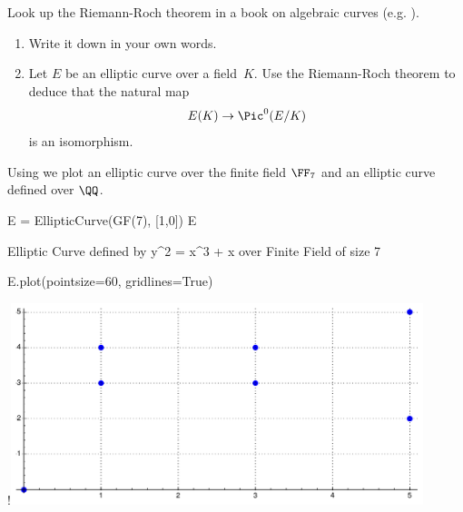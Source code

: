 \begin{exercise}
  Look up the Riemann-Roch theorem in a book on algebraic curves
  (e.g. \cite{hartshorne,liu2006algebraic}).
  \begin{enumerate}[label=(\alph*)]
    \item Write it down in your own words.
    \item Let $E$ be an elliptic curve over a field~$K$.
    Use the Riemann-Roch theorem to deduce that the natural map
    \[
      E(K) \to \Pic^0(E/K)
    \]
    is an isomorphism.
  \end{enumerate}
\end{exercise}

Using {\Sage} we plot an elliptic curve over the finite field $\FF_7$ and an
elliptic curve defined over $\QQ$.
\begin{sagecode} %
\begin{sagecell}
E = EllipticCurve(GF(7), [1,0])
E
\end{sagecell}
\begin{sageout}
Elliptic Curve defined by y^2 = x^3 + x over
Finite Field of size 7
\end{sageout}
\end{sagecode}
\begin{sagecode}
\begin{sagecell} %
E.plot(pointsize=60, gridlines=True)
\end{sagecell}
\begin{sageout}[escapechar=!]
!\includegraphics[width=0.9\textwidth]{img/ecmod7}
\end{sageout}
\end{sagecode}

